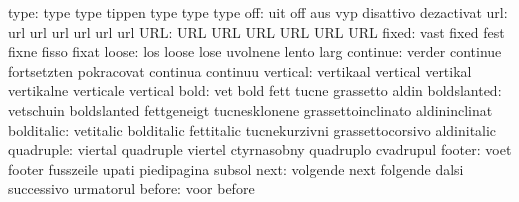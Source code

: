                      type: type                      type
                           tippen                    type
                           type                      type %
                      off: uit                       off
                           aus                       vyp
                           disattivo                 dezactivat
                      url: url                       url
                           url                       url
                           url                       url
                      URL: URL                       URL
                           URL                       URL
                           URL                       URL
                    fixed: vast                      fixed
                           fest                      fixne
                           fisso                     fixat
                    loose: los                       loose
                           lose                      uvolnene
                           lento                     larg
                 continue: verder                    continue
                           fortsetzten               pokracovat
                           continua                  continuu
                 vertical: vertikaal                 vertical
                           vertikal                  vertikalne
                           verticale                 vertical
                     bold: vet                       bold
                           fett                      tucne
                           grassetto                 aldin
              boldslanted: vetschuin                 boldslanted
                           fettgeneigt               tucnesklonene
                           grassettoinclinato        aldininclinat
               bolditalic: vetitalic                 bolditalic
                           fettitalic                tucnekurzivni
                           grassettocorsivo          aldinitalic
                quadruple: viertal                   quadruple
                           viertel                   ctyrnasobny
                           quadruplo                 cvadrupul
                   footer: voet                      footer
                           fusszeile                 upati
                           piedipagina               subsol
                     next: volgende                  next
                           folgende                  dalsi
                           successivo                urmatorul
                   before: voor                      before
